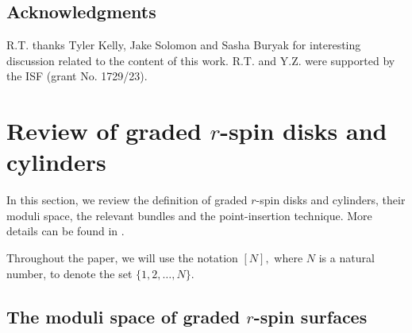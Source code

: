 \documentclass[11pt]{amsart}
\theoremstyle{definition}
\theoremstyle{remark}
\newcommand{\<}{\left<}
\renewcommand{\>}{\right>}
\numberwithin{equation}{section}
\begin{document}
\subsection{Acknowledgments}
R.T. thanks Tyler Kelly, Jake Solomon and Sasha Buryak for interesting discussion related to the content of this work. R.T. and Y.Z. were supported by the ISF (grant No. 1729/23).



\section{Review of graded $r$-spin disks and cylinders}\label{sec review}
\label{sec mod and bundle}
In %
this section, we review the definition of graded $r$-spin disks and cylinders, their moduli space, the %
relevant bundles and %
the point-insertion technique. %
More details can be found in \cite{BCT1,TZ1}.

Throughout %
the paper, we %
will use the notation $[N],$ where $N$ is a natural number, to denote the set $\{1,2,\dots,N\}.$


\subsection{The moduli space of graded $r$-spin surfaces}
\end{document}
